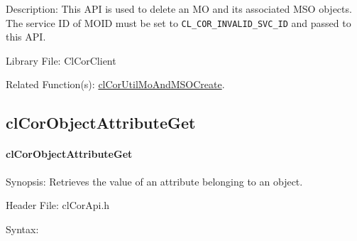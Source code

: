 \begin{flushleft}
\begin{Desc}
\begin{description}
\end{description}
\end{Desc}

\begin{Desc}
\item[Description:]This API is used to delete an MO and its associated MSO objects. The service ID of MOID must be set to 
{\tt{CL\_\-COR\_\-INVALID\_\-SVC\_\-ID}} and passed to this API.
\end{Desc}

\begin{Desc}
\item[Library File:]Cl\-Cor\-Client\end{Desc}

\begin{Desc}
\item[Related Function(s):]\hyperlink{pagecor103}{clCorUtilMoAndMSOCreate}. \end{Desc}
\newpage





\subsection{clCorObjectAttributeGet}
\hypertarget{pagecor105}{}\paragraph{cl\-Cor\-Object\-Attribute\-Get}\label{pagecor105}
\begin{Desc}
\item[Synopsis:]Retrieves the value of an attribute belonging to an object.\end{Desc}
\begin{Desc}
\item[Header File:]clCorApi.h\end{Desc}
\begin{Desc}
\item[Syntax:]


\end{Desc}
\end{flushleft}
